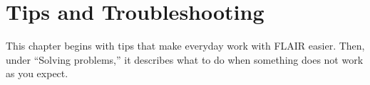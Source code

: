 \chapter{Tips and Troubleshooting}
\label{ch:trouble}

This chapter begins with tips that make everyday work with FLAIR easier.
Then, under ``Solving problems,'' it describes what to do when something
does not work as you expect.


